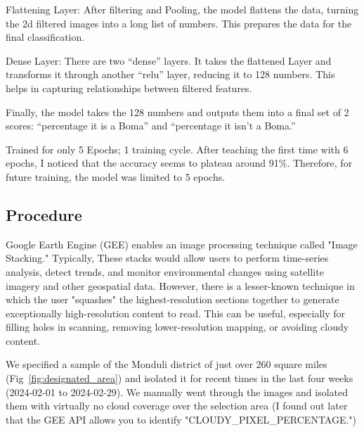 \documentclass[10pt]{article}
\begin{document}
Flattening Layer: After filtering and Pooling, the model flattens the data, turning the 2d filtered images into a long list of numbers. This prepares the data for the final classification.

Dense Layer: There are two “dense” layers. It takes the flattened Layer and transforms it through another “relu” layer, reducing it to 128 numbers. This helps in capturing relationships between filtered features.

Finally, the model takes the 128 numbers and outputs them into a final set of 2 scores: “percentage it is a Boma” and “percentage it isn't a Boma.”

Trained for only 5 Epochs; 1 training cycle. After teaching the first time with 6 epochs, I noticed that the accuracy seems to plateau around 91\%. Therefore, for future training, the model was limited to 5 epochs.


\subsection{Procedure}
\label{procedure}

Google Earth Engine (GEE) enables an image processing technique called "Image Stacking." Typically, These stacks would allow users to perform time-series analysis, detect trends, and monitor environmental changes using satellite imagery and other geospatial data. However, there is a lesser-known technique in which the user "squashes" the highest-resolution sections together to generate exceptionally high-resolution content to read. This can be useful, especially for filling holes in scanning, removing lower-resolution mapping, or avoiding cloudy content. 

We specified a sample of the Monduli district of just over 260 square miles (Fig~\ref{fig:designated_area}) and isolated it for recent times in the last four weeks (2024-02-01 to 2024-02-29). We manually went through the images and isolated them with virtually no cloud coverage over the selection area (I found out later that the GEE API allows you to identify "CLOUDY\_PIXEL\_PERCENTAGE.")
\end{document}
